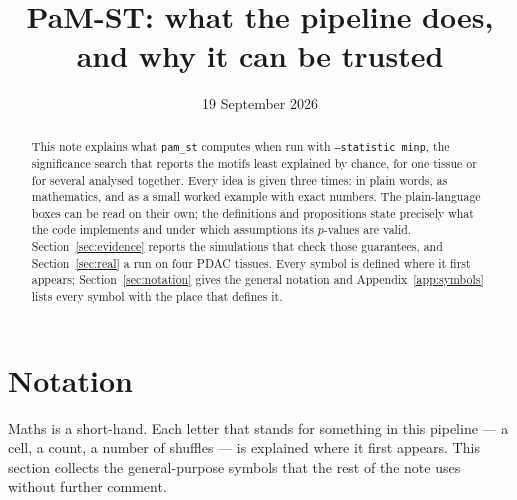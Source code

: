 \documentclass[11pt,a4paper]{article}
\title{PaM-ST: what the pipeline does, and why it can be trusted}
\author{}
\date{19 September 2026}
\theoremstyle{remark}
\begin{document}
\maketitle

\begin{abstract}
This note explains what \texttt{pam\_st} computes when run with
\texttt{--statistic minp}, the significance search that reports the motifs
least explained by chance, for one tissue or for several analysed together.
Every idea is given three times: in plain words, as mathematics, and as a small
worked example with exact numbers. The plain-language boxes can be read on
their own; the definitions and propositions state precisely what the code
implements and under which assumptions its $p$-values are valid.
Section~\ref{sec:evidence} reports the simulations that check those
guarantees, and Section~\ref{sec:real} a run on four PDAC tissues. Every
symbol is defined where it first appears; Section~\ref{sec:notation} gives the
general notation and Appendix~\ref{app:symbols} lists every symbol with the
place that defines it.
\end{abstract}

\tableofcontents

\section{Notation}
\label{sec:notation}

\begin{plain}
Maths is a short-hand. Each letter that stands for something in this pipeline
--- a cell, a count, a number of shuffles --- is explained where it first
appears. This section collects the general-purpose symbols that the rest of
the note uses without further comment.
\end{plain}
\end{document}

